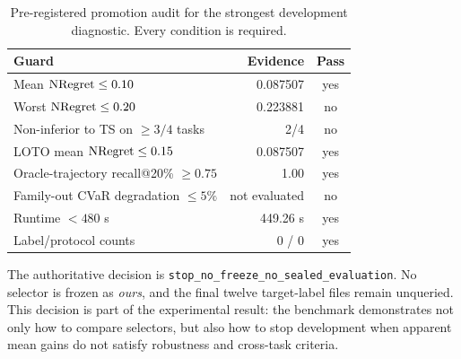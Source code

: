 \begin{table}[t]
  \caption{Pre-registered promotion audit for the strongest development
  diagnostic. Every condition is required.}
  \label{tab:promotion}
  \centering
  \small
  \begin{tabular}{lrc}
    \toprule
    Guard & Evidence & Pass \\
    \midrule
    Mean $\operatorname{NRegret}\leq0.10$ & 0.087507 & yes \\
    Worst $\operatorname{NRegret}\leq0.20$ & 0.223881 & no \\
    Non-inferior to TS on $\geq3/4$ tasks & 2/4 & no \\
    LOTO mean $\operatorname{NRegret}\leq0.15$ & 0.087507 & yes \\
    Oracle-trajectory recall@20\% $\geq0.75$ & 1.00 & yes \\
    Family-out CVaR degradation $\leq5\%$ & not evaluated & no \\
    Runtime $<480$ s & 449.26 s & yes \\
    Label/protocol counts & 0 / 0 & yes \\
    \bottomrule
  \end{tabular}
\end{table}

The authoritative decision is
\texttt{stop\_no\_freeze\_no\_sealed\_evaluation}. No selector is frozen as
\emph{ours}, and the final twelve target-label files remain unqueried. This
decision is part of the experimental result: the benchmark demonstrates not
only how to compare selectors, but also how to stop development when apparent
mean gains do not satisfy robustness and cross-task criteria.
